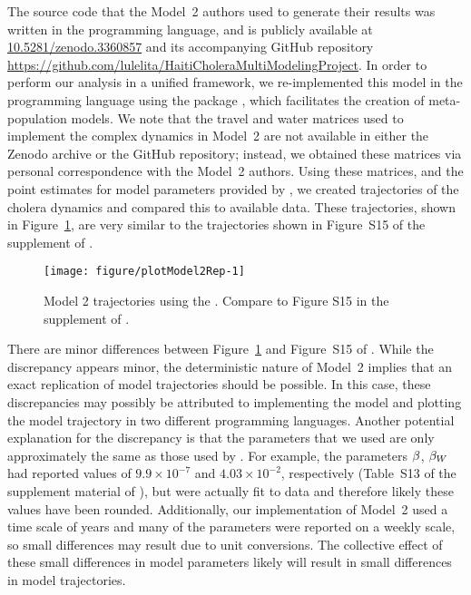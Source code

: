 The source code that the Model~2 authors used to generate their results was written in the  programming language, and is publicly available at \url{10.5281/zenodo.3360857} and its accompanying GitHub repository \url{https://github.com/lulelita/HaitiCholeraMultiModelingProject}.
In order to perform our analysis in a unified framework, we re-implemented this model in the  programming language using the  package \citep{asfaw24}, which facilitates the creation of meta-population models.
We note that the travel and water matrices used to implement the complex dynamics in Model~2 are not available in either the Zenodo archive or the GitHub repository;
instead, we obtained these matrices via personal correspondence with the Model~2 authors.
Using these matrices, and the point estimates for model parameters provided by \citet{lee20}, we created trajectories of the cholera dynamics and compared this to available data.
These trajectories, shown in Figure~\ref{fig:mod2rep}, are very similar to the trajectories shown in Figure~S15 of the supplement of \citet{lee20}.




\begin{figure}[!h]
\begin{knitrout}
\color{fgcolor}
\texttt{[image: figure/plotModel2Rep-1]} 
\end{knitrout}
\caption[Model~2 trajectories.]{\label{fig:mod2rep}
Model 2 trajectories using the . Compare to Figure S15 in the supplement of \citet{lee20}.
}
\end{figure}

There are minor differences between Figure~\ref{fig:mod2rep} and Figure~S15 of \citet{lee20}.
While the discrepancy appears minor, the deterministic nature of Model~2 implies that an exact replication of model trajectories should be possible.
In this case, these discrepancies may possibly be attributed to implementing the model and plotting the model trajectory in two different programming languages.
Another potential explanation for the discrepancy is that the parameters that we used are only approximately the same as those used by \citet{lee20}.
For example, the parameters $\beta$, $\beta_{W}$ had reported values of $9.9 \times 10^{-7}$ and $4.03 \times 10^{-2}$, respectively (Table~S13 of the supplement material of \citet{lee20}), but were actually fit to data and therefore likely these values have been rounded.
Additionally, our implementation of Model~2 used a time scale of years and many of the parameters were reported on a weekly scale, so small differences may result due to unit conversions.
The collective effect of these small differences in model parameters likely will result in small differences in model trajectories.

